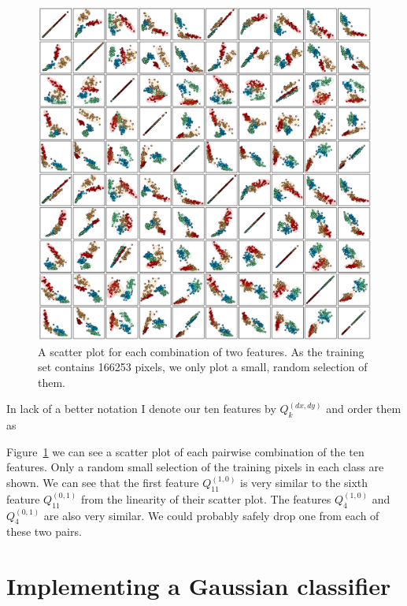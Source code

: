 \documentclass[a4paper]{article}
\begin{document}
\begin{figure}
    \centering
    \includegraphics[width=\textwidth]{feat_comp.png}
    \caption{%
        A scatter plot for each combination of two features. As the
        training set contains 166253 pixels, we only plot a small,
        random selection of them.
    }
    \label{fig:feat_comp}
\end{figure}

In lack of a better notation I denote our ten features by $Q_{k}^{(dx,
dy)}$ and order them as
\begin{equation}
    [Q^{(1,0)}_{11}, Q^{(1,0)}_{12}, Q^{(1,0)}_{14}, Q^{(1,0)}_{2},
        Q^{(1,0)}_{4}, Q^{(0,1)}_{11}, Q^{(0,1)}_{12}, Q^{(0,1)}_{14},
    Q^{(0,1)}_{2}, Q^{(0,1)}_{4}]
\end{equation}

Figure~\ref{fig:feat_comp} we can see a scatter plot of each pairwise
combination of the ten features. Only a random small selection of the
training pixels in each class are shown. We can see that the first
feature $Q^{(1,0)}_{11}$ is very similar to the sixth feature
$Q^{(0,1)}_{11}$ from the linearity of their scatter plot. The features
$Q^{(1,0)}_{4}$ and $Q^{(0,1)}_{4}$ are also very similar. We could
probably safely drop one from each of these two pairs.

\section{Implementing a Gaussian classifier}
\end{document}
